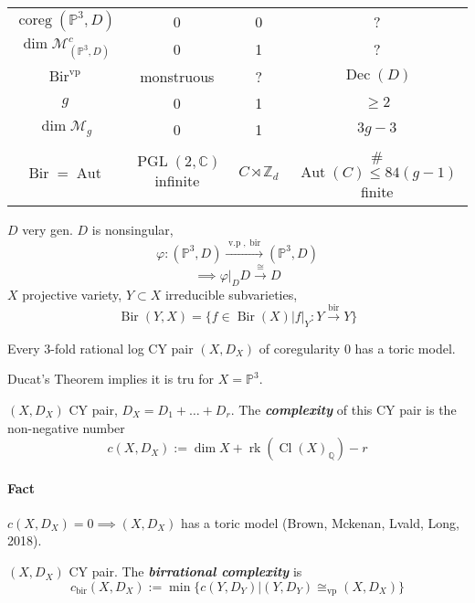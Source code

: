 \begin{conjecture}[Trichotomy]
\leavevmode 

\begin{table}[H]
	\centering
	\begin{tabular}{c|ccc}
		$\operatorname{coreg}(\mathbb{P}^3,D)$&0&0&?\\
		$\dim \mathcal{M}_{(\mathbb{P}^3,D)}^c$ &0&1&?\\
		$\operatorname{Bir}^{\operatorname{vp}}$ &monstruous&?&$\operatorname{Dec}(D)$ \\
		\hline
		$g$&0&1&$\geq 2$\\
		$\dim \mathcal{M}_{g}$ &0&1&$3g-3$\\
	$\operatorname{Bir}=\operatorname{Aut}$ &$\operatorname{PGL}(2,\mathbb{C})$ infinite&$C\rtimes\mathbb{Z}_d$&\#$\operatorname{Aut}(C)\leq 84(g-1)$ finite
	\end{tabular}
\end{table}
\end{conjecture}

$D$ very gen. $D$ is nonsingular,
\[\varphi:(\mathbb{P}^3,D)\overset{\operatorname{v.p}, \operatorname{bir}}{\longrightarrow}(\mathbb{P}^3,D)\] 
\[\implies \varphi |_D D\overset{\cong }{\longrightarrow}D\]
$X$ projective variety, $Y\subset X$ irreducible subvarieties,
\[\operatorname{Bir}(Y,X)=\{f\in\operatorname{Bir}(X)|f|_Y:Y\overset{\operatorname{bir}}{\longrightarrow}Y\}\]

\begin{conjecture}[Shokuroo]
	Every 3-fold rational log CY pair $(X,D_X)$ of coregularity 0 has a toric model.
\end{conjecture}

Ducat's Theorem implies it is tru for $X=\mathbb{P}^3$.

\begin{defn}
	$(X,D_X)$ CY pair, $D_X=D_1+\ldots+D_r$. The \textit{\textbf{complexity}} of this CY pair is the non-negative number
	\[c(X,D_X):=\dim X+\operatorname{rk}(\operatorname{Cl}(X)_{\mathbb{Q}})-r\]
\end{defn}

\paragraph{Fact} $c(X,D_X)=0\implies (X,D _X)$ has a toric model (Brown, Mckenan, Lvald, Long, 2018).

\begin{defn}
	$(X,D_X)$ CY pair. The \textit{\textbf{birrational complexity}} is 
	\[c_{\operatorname{bir}}(X,D_X):=\min\{c(Y,D_Y)|(Y,D_Y)\cong_{\operatorname{vp}}(X,D_X)\}\]
\end{defn}

